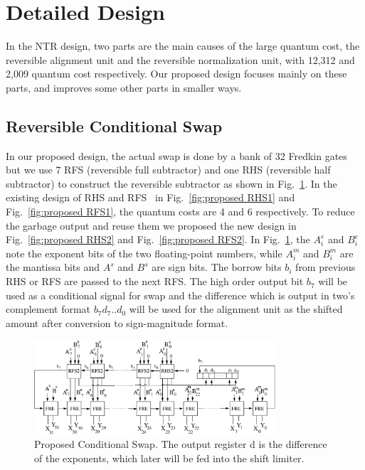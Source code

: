 \documentclass[%
reprint,
 amsmath,amssymb,
 aps,
]{revtex4-1}
\begin{document}
\section{Detailed Design}

In the NTR design, two parts are the main causes of the large quantum cost, the reversible alignment unit and the reversible normalization unit, with 12,312 and 2,009 quantum cost respectively. Our proposed design focuses mainly on these parts, and improves some other parts in smaller ways.   

\subsection{Reversible Conditional Swap}

\par In our proposed design, the actual swap is done by a bank of 32 Fredkin gates but we use 7 RFS (reversible full subtractor) and one RHS (reversible half subtractor) to construct the reversible subtractor as shown in Fig.~\ref{fig:proposed_swap}. In the existing design of RHS and RFS~\cite{new-subtractor} in Fig.~\ref{fig:proposed RHS1} and Fig.~\ref{fig:proposed RFS1}, the quantum costs are 4 and 6 respectively. To reduce the garbage output and reuse them we proposed the new design in Fig.~\ref{fig:proposed RHS2} and Fig.~\ref{fig:proposed RFS2}. In Fig.~\ref{fig:proposed_swap}, the $A_i^e$ and $B_i^e$ note the exponent bits of the two floating-point numbers, while $A_i^m$ and $B_i^m$ are the mantissa bits and $A^s$ and $B^s$ are sign bits. The borrow bits $b_i$ from previous RHS or RFS are passed to the next RFS. The high order output bit $b_7$ will be used as a conditional signal for swap and the difference which is output in two's complement format $b_7d_7..d_0$ will be used for the alignment unit as the shifted amount after conversion to sign-magnitude format. 

\begin{figure}[ht]
\centering
\includegraphics[width=0.8\textwidth]{conditional-swap.eps}
\caption{Proposed Conditional Swap. The output register d is the difference of the exponents, which later  will be fed into the shift limiter.} 
\label{fig:proposed_swap}
\end{figure}
\end{document}
